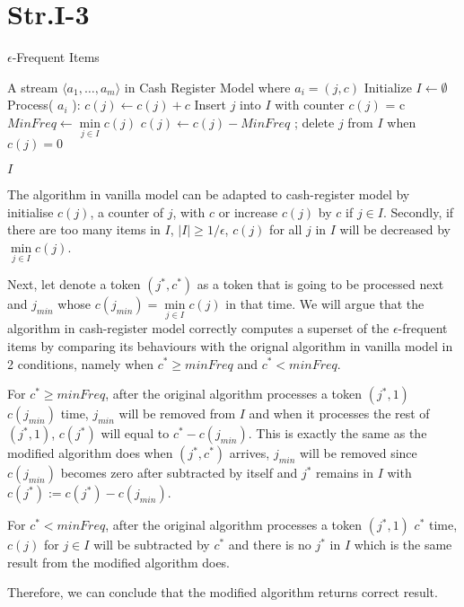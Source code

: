 
\section*{Str.I-3}

\begin{algorithm}[h]
  \caption{ $\epsilon$-Frequent Items}
  \label{alg:frequent-items}
  \begin{algorithmic}
      \Require A stream $\langle a_1, \dotsc, a_m \rangle $ in Cash Register Model where $a_i = (j,c)$
      \State Initialize $I \gets \emptyset$
      \State Process( $a_i $ ):
      	\State $c(j) \gets c(j) + c$
      \Else
      \State Insert $j$ into $I$ with counter $c(j)$ = c
		\State $MinFreq \gets   \min\limits_{  j \in I}  c(j)$
			\State $c(j) \gets c(j) - MinFreq$ ; delete $j$ from $I$ when $c(j)=0$
		\EndFor
	\EndIf
     \EndIf
     
  \Return $I$
\end{algorithmic}
\end{algorithm}

The algorithm in vanilla model can be adapted to cash-register model by initialise $c(j)$, a counter of $j$, with $c$ or increase $c(j)$ by $c$ if $j \in I$. Secondly, if there are too many items in $I$, $ |I| \ge 1/\epsilon$, $c(j)$ for all $j$ in $I$ will be decreased by  $\min\limits_{  j \in I}  c(j)$.

Next, let denote a token $( j^*, c^* )$ as a token that is going to be processed next and $j_{min}$ whose $c(j_{min})  = \min\limits_{  j \in I}  c(j)$ in that time.  We will argue that the algorithm in cash-register model correctly computes a superset of the $\epsilon$-frequent items by comparing its behaviours with the orignal algorithm in vanilla model in 2 conditions, namely when $c^* \ge minFreq$ and $c^* < minFreq$.

For $c^* \ge minFreq$, after the original algorithm processes a token $(j^*, 1)$ $c(j_{min})$ time, $j_{min}$ will be removed from $I$ and when it processes the rest of $(j^*, 1)$, $c(j^*)$ will equal to $c^* - c(j_{min})$. This is exactly the same as the modified algorithm does when $(j^*, c^*)$ arrives, $j_{min}$ will be removed since $c(j_{min})$ becomes zero after subtracted by itself and $j^*$ remains in $I$ with $c(j^*) := c(j^*) - c(j_{min})$.

For $c^* < minFreq$, after the original algorithm processes a token $(j^*, 1)$  $c^*$ time,  $c(j)$ for  $j \in I$ will be subtracted by $c^*$ and there is no $j^*$ in $I$ which is the same result from the modified algorithm does.

Therefore, we can conclude that the modified algorithm returns correct result.